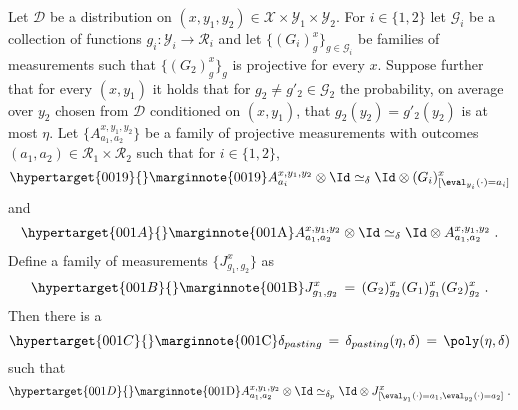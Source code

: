 \begin{lemma}
\hypertarget{0018}{}
\reversemarginpar{}
  \label{lem:pasting}
Let $\mathcal{D}$ be a distribution on $(x,y_1,y_2)\in \mathcal{X}\times \mathcal{Y}_1\times \mathcal{Y}_2$. For $i\in \{1,2\}$ let $\mathcal{G}_i$ be a collection of functions $g_i: \mathcal{Y}_i \to \mathcal{R}_i$ and let $\{(G_i)^{x}_{g}\}_{g\in \mathcal{G}_i}$ be families of measurements such that $\{(G_2)^x_g\}_g$ is projective for every $x$. Suppose further that for every $(x,y_1)$ it holds that for $g_2\neq g'_2 \in \mathcal{G}_2$ the probability, on average over $y_2$ chosen from $\mathcal{D}$ conditioned on $(x,y_1)$, that $g_2(y_2)=g'_2(y_2)$  is at most $\eta$. 
Let $\{A^{x,y_1,y_2}_{a_1,a_2}\}$ be a family of projective measurements with outcomes $(a_1,a_2)\in \mathcal{R}_1 \times \mathcal{R}_2$ such that for $i\in \{1,2\}$,
\begin{equation}
\hypertarget{0019}{}
\reversemarginpar\marginnote{\textnormal{0019}}
  \label{eq:pasting-1}
 A^{x,y_1,y_2}_{a_i} \otimes \Id \simeq_\delta \Id \otimes (G_i)^x_{[\eval_{y_i}(\cdot)=a_i]}
\end{equation}
and 
\begin{equation}
\hypertarget{001A}{}
\reversemarginpar\marginnote{\textnormal{001A}}
  \label{eq:pasting-2}
 A^{x,y_1,y_2}_{a_1,a_2} \otimes \Id \simeq_\delta \Id \otimes  A^{x,y_1,y_2}_{a_1,a_2}\;.
\end{equation}
Define a family of measurements $\{J^x_{g_1,g_2}\}$ as
\begin{equation}
\hypertarget{001B}{}
\reversemarginpar\marginnote{\textnormal{001B}}
  \label{eq:pasting-2a}
 J^x_{g_1,g_2} \,=\, (G_2)^x_{g_2} (G_1)^x_{g_1} (G_2)^x_{g_2}\;.
\end{equation}
Then there is a 
\begin{equation}
\hypertarget{001C}{}
\reversemarginpar\marginnote{\textnormal{001C}}
  \label{eq:def-deltap}
\delta_{pasting} \,=\, \delta_{pasting}(\eta,\delta)\,=\, \poly(\eta,\delta)
\end{equation} such that 
\begin{equation}
\hypertarget{001D}{}
\reversemarginpar\marginnote{\textnormal{001D}}
  \label{eq:pasting-3}
 A^{x,y_1,y_2}_{a_1,a_2} \otimes \Id \simeq_{\delta_p} \Id \otimes J^x_{[\eval_{y_1}(\cdot)=a_1,\eval_{y_2}(\cdot) = a_2]}\;.
\end{equation}
\end{lemma}
%
